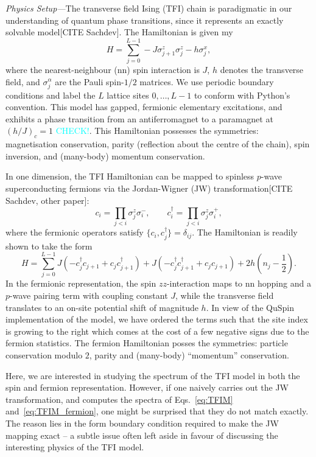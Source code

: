 \documentclass{SciPost}
\newcommand\0{\scalebox{-1}[1]{0}}
\newcommand*{\cyan}{\textcolor{cyan}}
\begin{document}
\noindent\emph{Physics Setup---}The transverse field Ising (TFI) chain is paradigmatic in our understanding of quantum phase transitions, since it represents an exactly solvable model[CITE Sachdev]. The Hamiltonian is given my
\begin{equation}
H=\sum_{j=0}^{L-1}-J\sigma^z_{j+1}\sigma^z_j - h\sigma^x_j,
\label{eq:TFIM}
\end{equation} 
where the nearest-neighbour (nn) spin interaction is $J$, $h$ denotes the transverse field, and $\sigma^\alpha_j$ are the Pauli spin-$1/2$ matrices. We use periodic boundary conditions and label the $L$ lattice sites $0,\dots,L-1$ to conform with Python's convention. This model has gapped, fermionic elementary excitations, and exhibits a phase transition from an antiferromagnet to a paramagnet at $\left(h/J\right)_c=1$ \cyan{CHECK!}. This Hamiltonian possesses the symmetries: magnetisation conservation, parity (reflection about the centre of the chain), spin inversion, and (many-body) momentum conservation.

In one dimension, the TFI Hamiltonian can be mapped to spinless $p$-wave superconducting fermions via the Jordan-Wigner (JW) transformation[CITE Sachdev, other paper]:
\begin{equation}
c_i=\prod_{j<i}\sigma^z_j\sigma^-_i,\qquad c^\dagger_i=\prod_{j<i}\sigma^z_j\sigma^+_i,
\label{eq:JW_transf}
\end{equation} 
where the fermionic operators satisfy $\{c_i,c^\dagger_j\}=\delta_{ij}$. The Hamiltonian is readily shown to take the form
\begin{equation}
H=\sum_{j=0}^{L-1}J\left(-c^\dagger_jc_{j+1} + c_jc^\dagger_{j+1} \right) +J\left( -c^\dagger_jc^\dagger_{j+1} + c_jc_{j+1}\right) + 2h\left(n_j-\frac{1}{2}\right).
\label{eq:TFIM_fermion}
\end{equation}
In the fermionic representation, the spin $zz$-interaction maps to nn hopping and a $p$-wave pairing term with coupling constant $J$, while the transverse field translates to an on-site potential shift of magnitude $h$. In view of the QuSpin implementation of the model, we have ordered the terms such that the site index is growing to the right which comes at the cost of a few negative signs due to the fermion statistics. The fermion Hamiltonian posses the symmetries: particle conservation modulo $2$, parity and (many-body) ``momentum'' conservation.

Here, we are interested in studying the spectrum of the TFI model in both the spin and fermion representation. However, if one naively carries out the JW transformation, and computes the spectra of Eqs.~\eqref{eq:TFIM} and~\eqref{eq:TFIM_fermion}, one might be surprised that they do not match exactly. The reason lies in the form boundary condition required to make the JW mapping exact -- a subtle issue often left aside in favour of discussing the interesting physics of the TFI model. 
\end{document}
